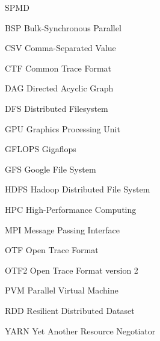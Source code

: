 \begin{listofabbrv}{SPMD}
	\item[BSP] Bulk-Synchronous Parallel
	\item[CSV] Comma-Separated Value
	\item[CTF] Common Trace Format
        \item[DAG] Directed Acyclic Graph
        \item[DFS] Distributed Filesystem
        \item[GPU] Graphics Processing Unit
        \item[GFLOPS] Gigaflops
        \item[GFS] Google File System
        \item[HDFS] Hadoop Distributed File System
        \item[HPC] High-Performance Computing
        \item[MPI] Message Passing Interface
        \item[OTF] Open Trace Format
        \item[OTF2] Open Trace Format version 2
        \item[PVM] Parallel Virtual Machine
        \item[RDD] Resilient Distributed Dataset
        \item[YARN] Yet Another Resource Negotiator
\end{listofabbrv}


\listoffigures

\listoftables

\tableofcontents